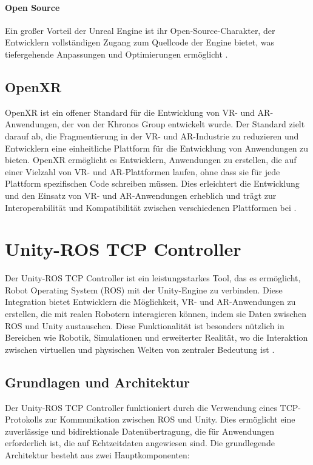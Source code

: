\paragraph{Open Source}
Ein großer Vorteil der Unreal Engine ist ihr Open-Source-Charakter, der Entwicklern vollständigen Zugang zum Quellcode der Engine bietet, was tiefergehende Anpassungen und Optimierungen ermöglicht \cite{epic2021}.

\subsection{OpenXR}
OpenXR ist ein offener Standard für die Entwicklung von \ac{VR}- und \ac{AR}-Anwendungen, der von der Khronos Group entwickelt wurde. Der Standard zielt darauf ab, die Fragmentierung in der VR- und AR-Industrie zu reduzieren und Entwicklern eine einheitliche Plattform für die Entwicklung von Anwendungen zu bieten. OpenXR ermöglicht es Entwicklern, Anwendungen zu erstellen, die auf einer Vielzahl von \ac{VR}- und \ac{AR}-Plattformen laufen, ohne dass sie für jede Plattform spezifischen Code schreiben müssen. Dies erleichtert die Entwicklung und den Einsatz von \ac{VR}- und \ac{AR}-Anwendungen erheblich und trägt zur Interoperabilität und Kompatibilität zwischen verschiedenen Plattformen bei \cite{unityOpenXR2021}.
\section{Unity-ROS TCP Controller}

Der Unity-ROS TCP Controller ist ein leistungsstarkes Tool, das es ermöglicht, Robot Operating System (ROS) mit der Unity-Engine zu verbinden. Diese Integration bietet Entwicklern die Möglichkeit, VR- und AR-Anwendungen zu erstellen, die mit realen Robotern interagieren können, indem sie Daten zwischen ROS und Unity austauschen. Diese Funktionalität ist besonders nützlich in Bereichen wie Robotik, Simulationen und erweiterter Realität, wo die Interaktion zwischen virtuellen und physischen Welten von zentraler Bedeutung ist \cite{ros_tcp_endpoint,unity_ros_tcp_connector}.

\subsection{Grundlagen und Architektur}

Der Unity-ROS TCP Controller funktioniert durch die Verwendung eines TCP-Protokolls zur Kommunikation zwischen ROS und Unity. Dies ermöglicht eine zuverlässige und bidirektionale Datenübertragung, die für Anwendungen erforderlich ist, die auf Echtzeitdaten angewiesen sind. Die grundlegende Architektur besteht aus zwei Hauptkomponenten:

